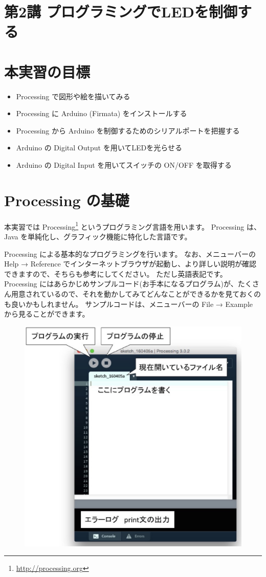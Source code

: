 \documentclass[11pt,a4paper]{jarticle}
\begin{document}
\section*{\LARGE{第2講 プログラミングでLEDを制御する}}
\section{本実習の目標}
\begin{itemize}
\item Processing で図形や絵を描いてみる
\item Processing に Arduino (Firmata) をインストールする
\item Processing から Arduino を制御するためのシリアルポートを把握する
\item Arduino の Digital Output を用いてLEDを光らせる
\item Arduino の Digital Input を用いてスイッチの ON/OFF を取得する
\end{itemize}



\section{Processing の基礎}
本実習では Processing\footnote{\url{http://processing.org}} というプログラミング言語を用います。
Processing は、Java を単純化し、グラフィック機能に特化した言語です。

Processing による基本的なプログラミングを行います。
なお、メニューバーの Help → Reference でインターネットブラウザが起動し、より詳しい説明が確認できますので、そちらも参考にしてください。
ただし英語表記です。
Processing にはあらかじめサンプルコード(お手本になるプログラム)が、たくさん用意されているので、それを動かしてみてどんなことができるかを見ておくのも良いかもしれません。
サンプルコードは、メニューバーの File → Example から見ることができます。

\begin{figure}[h!]
 \centering
 \includegraphics[width=0.35\columnwidth]{processing_ide.eps}
\end{figure}
\end{document}
